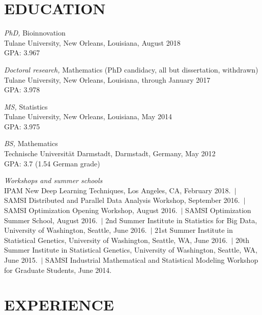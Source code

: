 \documentclass[overlapped, line, 10pt]{res} %
\begin{document}
\begin{resume}

\section{EDUCATION}

{\sl PhD,} Bioinnovation \\
Tulane University, New Orleans, Louisiana, August 2018\\
GPA: 3.967

{\sl Doctoral research,} Mathematics (PhD candidacy, all but dissertation, withdrawn)\\
Tulane University, New Orleans, Louisiana, through January 2017\\
GPA: 3.978

{\sl MS,} Statistics \\
Tulane University, New Orleans, Louisiana, May 2014\\
GPA: 3.975

{\sl BS,} Mathematics\\
Technische Universit\"{a}t Darmstadt, Darmstadt, Germany, May 2012\\
GPA: 3.7 (1.54 German grade)

{\sl Workshops and summer schools}\\
IPAM New Deep Learning Techniques, Los Angeles, CA, February 2018.~$|$
SAMSI Distributed and Parallel Data Analysis Workshop, September 2016.~$|$
SAMSI Optimization Opening Workshop, August 2016.~$|$
SAMSI Optimization Summer School, August 2016.~$|$
2nd Summer Institute in Statistics for Big Data, University of Washington, Seattle, June 2016.~$|$
21st Summer Institute in Statistical Genetics, University of Washington, Seattle, WA, June 2016.~$|$
20th Summer Institute in Statistical Genetics, University of Washington, Seattle, WA, June 2015.~$|$
SAMSI Industrial Mathematical and Statistical Modeling Workshop for Graduate Students, June 2014.


\section{EXPERIENCE}


\end{resume}
\end{document}

